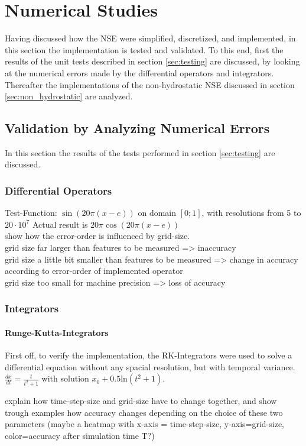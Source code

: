 \chapter{Numerical Studies}
Having discussed how the NSE were simplified, discretized, and implemented, in this section the implementation is tested and validated.
To this end, first the results of the unit tests described in section \ref{sec:testing} are discussed, by looking at the numerical errors made by the differential operators and integrators.
Thereafter the implementations of the non-hydrostatic NSE discussed in section \ref{sec:non_hydrostatic} are analyzed.

\section{Validation by Analyzing Numerical Errors}
In this section the results of the tests performed in section \ref{sec:testing} are discussed.

\subsection{Differential Operators}
Test-Function: $\sin(20\pi (x-e))$ on domain $[0;1]$, with resolutions from 5 to $20\cdot 10^7 $
Actual result is $20\pi\cos(20\pi (x-e))$\\
show how the error-order is influenced by grid-size.\\
grid size far larger than features to be measured => inaccuracy\\
grid size a little bit smaller than features to be measured => change in accuracy according to error-order of implemented operator\\
grid size too small for machine precision => loss of accuracy

\subsection{Integrators}
\subsubsection{Runge-Kutta-Integrators}
First off, to verify the implementation, the RK-Integrators were used to solve a differential equation without any spacial resolution, but with temporal variance.
$\frac{dx}{dt}=\frac{t}{t^2+1}$
with solution $x_0 + 0.5\text{ln}(t^2+1)$.

explain how time-step-size and grid-size have to change together, and show trough examples how accuracy changes depending on the choice of these two parameters (maybe a heatmap with x-axis = time-step-size, y-axis=grid-size, color=accuracy after simulation time T?)

